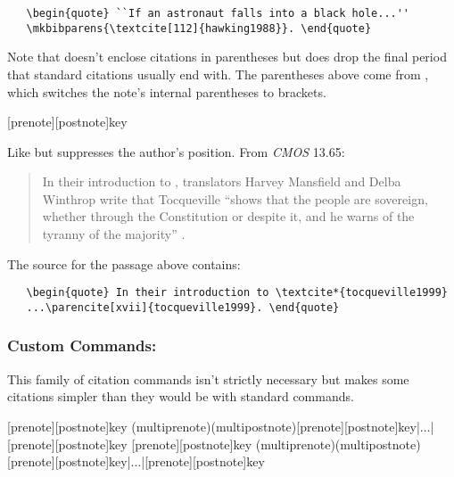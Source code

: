 \documentclass[11pt,letterpaper,oneside]{article}
\begin{document}
\begin{ltxsyntax}
\begin{verbatim}
   \begin{quote} ``If an astronaut falls into a black hole...''
   \mkbibparens{\textcite[112]{hawking1988}}. \end{quote}
\end{verbatim}

Note that  doesn't enclose citations in parentheses but
does drop the final period that standard citations usually end with.
The parentheses above come from , which switches the
note's internal parentheses to brackets.

[prenote][postnote]{key}

Like  but suppresses the author's position. From
\textit{CMOS} 13.65:

\begin{quote} In their introduction to \textcite*{tocqueville1999},
translators Harvey Mansfield and Delba Winthrop write that Tocqueville
``shows that the people are sovereign, whether through the
Constitution or despite it, and he warns of the tyranny of the
majority'' \parencite[xvii]{tocqueville1999}. \end{quote}

The source for the passage above contains:

\begin{verbatim}
   \begin{quote} In their introduction to \textcite*{tocqueville1999}
   ...\parencite[xvii]{tocqueville1999}. \end{quote}
\end{verbatim}

\end{ltxsyntax}

\subsubsection{Custom Commands: \emph{}}
\label{idemcite}

This family of citation commands isn't strictly necessary but makes
some citations simpler than they would be with standard commands.

\begin{ltxsyntax}
[prenote][postnote]{key}
(multiprenote)(multipostnote)[prenote][postnote]{key}|...|[prenote][postnote]{key}
[prenote][postnote]{key}
(multiprenote)(multipostnote)[prenote][postnote]{key}|...|[prenote][postnote]{key}
\end{ltxsyntax}
\end{document}
